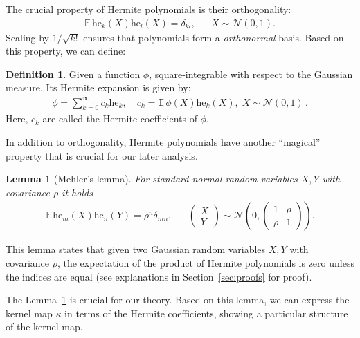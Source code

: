 \documentclass[twoside]{article}
\newcommand{\E}{\mathbb{E}\,}
\newcommand{\he}{\mathrm{he}}
\newtheorem{lemma}{Lemma}
\theoremstyle{definition}
\newtheorem{definition}{Definition}
\begin{document}
The crucial property of Hermite polynomials is their  orthogonality:
\begin{align}\label{eq:hermite_orthogonality}
\E\he_k(X)\he_l(X) = \delta_{kl}, && X \sim \mathcal N(0,1).
\end{align}
Scaling by $1/\sqrt{k!}$ ensures that polynomials form a \emph{orthonormal} basis. Based on this property, we can define:
\begin{definition}\label{def:hermite_expansion}
Given a function $\phi$, square-integrable with respect to the Gaussian measure. Its Hermite expansion is given by:
\begin{align*}
\phi = \sum_{k=0}^\infty c_k \he_k,\quad c_k = \E\phi(X) \he_k(X), \; X \sim \mathcal N (0,1)\,.
\end{align*}
Here, $c_k$ are called the Hermite coefficients of $\phi$. 
\end{definition}


In addition to orthogonality, Hermite polynomials have another ``magical'' property that is crucial for our later analysis. 

\begin{lemma}[Mehler's lemma]\label{lem:mehler_kernel}
For standard-normal random variables $X,Y$ with covariance $\rho$ it holds
\begin{align*}
\E\he_m(X)\he_n(Y) = \rho^n \delta_{mn}, && \begin{pmatrix}
    X \\ Y
\end{pmatrix}\sim \mathcal N\left(0, \begin{pmatrix} 1 & \rho \\ \rho & 1 \end{pmatrix}
 \right).
\end{align*}
\end{lemma}

This lemma states that given two Gaussian random variables $X, Y$ with covariance $\rho$, the expectation of the product of Hermite polynomials is zero unless the indices are equal (see explanations in Section~\ref{sec:proofs} for proof).

The Lemma~\ref{lem:mehler_kernel} is crucial for our theory. Based on this lemma, we can express the kernel map $\kappa$ in terms of the Hermite coefficients, showing a particular structure of the kernel map.
\end{document}
